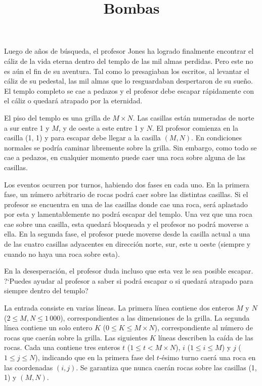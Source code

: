 \documentclass{oci}
\title{Bombas}
\begin{document}
\begin{problemDescription}
  Luego de años de búsqueda, el profesor Jones ha logrado finalmente encontrar el cáliz de la vida
  eterna dentro del templo de las mil almas perdidas.
  Pero este no es aún el fin de su aventura.
  Tal como lo presagiaban los escritos, al levantar el cáliz de su pedestal, las mil almas que lo
  resguardaban despertaron de su sueño.
  El templo completo se cae a pedazos y el profesor debe escapar rápidamente con el cáliz o quedará
  atrapado por la eternidad.

  El piso del templo es una grilla de $M\times N$.
  Las casillas están numeradas de norte a sur entre 1 y $M$, y de oeste a este entre 1 y $N$.
  El profesor comienza en la casilla (1, 1) y para escapar debe llegar a la casilla $(M, N)$.
  En condiciones normales se podría caminar libremente sobre la grilla.
  Sin embargo, como todo se cae a pedazos, en cualquier momento puede caer una roca sobre alguna de
  las casillas.

  Los eventos ocurren por turnos, habiendo dos fases en cada uno.
  En la primera fase, un número arbitrario de rocas podrá caer sobre las distintas casillas.
  Si el profesor se encuentra en una de las casillas donde cae una roca, será aplastado por esta y
  lamentablemente no podrá escapar del templo.
  Una vez que una roca cae sobre una casilla, esta quedará bloqueada y el profesor no podrá moverse
  a ella.
  En la segunda fase, el profesor puede moverse desde la casilla actual a una de las cuatro casillas
  adyacentes en dirección norte, sur, este u oeste (siempre y cuando no haya una roca sobre esta).

  En la desesperación, el profesor duda incluso que esta vez le sea posible escapar.
  ?`Puedes ayudar al profesor a saber si podrá escapar o si quedará atrapado para siempre dentro del
  templo?
\end{problemDescription}

\begin{inputDescription}
  La entrada consiste en varias líneas.
  La primera línea contiene dos enteros $M$ y $N$ ($2 \le M, N \le 1\,000$), correspondientes a las
  dimensiones de la grilla.
  La segunda línea contiene un solo entero $K$ ($0 \le K \le M\times N$), correspondiente al número de
  rocas que caerán sobre la grilla.
  Las siguientes $K$ líneas describen la caída de las rocas.
  Cada una contiene tres enteros $t$ ($1 \le t < M\times N$), $i$ ($1 \le i \le M$) y $j$ ($1 \le
  j \le N$), indicando que en la primera fase del $t$-ésimo turno caerá una roca en las coordenadas $(i,
  j)$.
  Se garantiza que nunca caerán rocas sobre las casillas (1, 1) y $(M, N)$.
\end{inputDescription}
\end{document}
